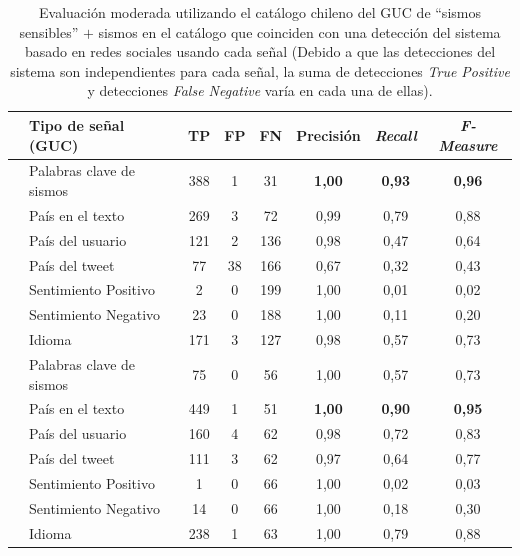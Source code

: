 \begin{table}
\centering
  \begin{tabular}{c|lcccccc}
    \toprule
    & \multicolumn{1}{l}{{Tipo de señal (GUC)}}&\multicolumn{1}{c}{{TP}}&\multicolumn{1}{c}{{FP}}&\multicolumn{1}{c}{{FN}}&\multicolumn{1}{c}{{Precisión}}&\multicolumn{1}{c}{{\em Recall}}&\multicolumn{1}{c}{{\em F-Measure}}\\
    \midrule
    \parbox[t]{1.5mm}{\vspace{-0.3cm}}
    & {Palabras clave de sismos} & 388 & 1 & 31 & {{\bf 1,00}} &  {{\bf 0,93}} & {{\bf 0,96}} \\
	& {País en el texto } & 269 & 3 & 72 & {0,99} & {0,79} & {0,88} \\    
    & {País del usuario} & 121 & 2 & 136  & {0,98} & {0,47} & {0,64} \\
    & {País del tweet} & 77 & 38 & 166 & {0,67} & {0,32} & {0,43} \\  
    & {Sentimiento Positivo} & 2 & 0 & 199 & {1,00} & {0,01} & {0,02} \\
    & {Sentimiento Negativo} & 23 & 0 & 188 & {1,00} &	{0,11} & {0,20} \\
    & {Idioma} & 171 & 3 & 127 & {0,98} & {0,57} & {0,73} \\
    \midrule
    \parbox[t]{1.5mm}{\vspace{-0.3cm}}
	& {Palabras clave de sismos} & 75 & 0 & 56 & {1,00} & {0,57} & {0,73} \\
	& {País en el texto} & 449 & 1 & 51 & {\bf 1,00} & {\bf 0,90} & {\bf 0,95} \\
	& {País del usuario} & 160 & 4 & 62 & {0,98} & {0,72} & {0,83} \\
	& {País del tweet} & 111 & 3 & 62 & {0,97} & {0,64} & {0,77} \\ 
	& {Sentimiento Positivo} & 1 & 0 & 66  & {1,00} & {0,02} & {0,03}  \\
	& {Sentimiento Negativo} & 14 & 0 & 66  & {1,00} & {0,18} & {0,30}  \\
	& {Idioma} & 238 & 1 & 63 & {1,00} & {0,79} & {0,88} \\
    \bottomrule
  \end{tabular}
  \caption{{Evaluación moderada utilizando el catálogo chileno del GUC de ``sismos sensibles'' $+$ sismos en el catálogo que coinciden con una detección del sistema basado en redes sociales usando cada señal (Debido a que las detecciones del sistema son independientes para cada señal, la suma de detecciones \textit{True Positive} y detecciones \textit{False Negative} varía en cada una de ellas).}}
  \label{table:moderate}
\end{table}


